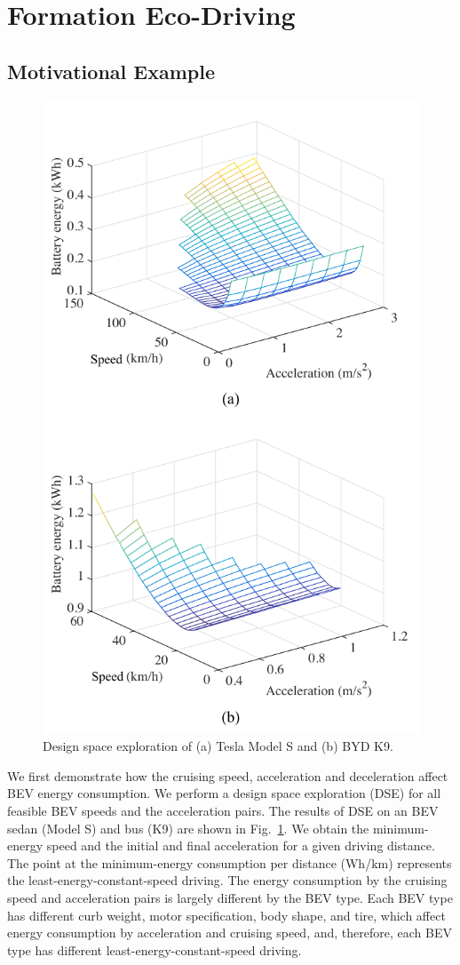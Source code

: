 \documentclass{IEEEtran}
\begin{document}
\section{Formation Eco-Driving}\label{sec:problem}

\subsection{Motivational Example}

\begin{figure}	%
\centering
\includegraphics[width=0.8\hsize]{Figures/DSE.pdf}
\caption{Design space exploration of (a) Tesla Model S and (b) BYD K9.}
\label{fig:DSE}
\end{figure} 


We first demonstrate how the cruising speed, acceleration and deceleration affect BEV energy consumption. We perform a design space exploration (DSE) for all feasible BEV speeds and the acceleration pairs. The results of DSE on an BEV sedan (Model S) and bus (K9) are shown in Fig.~\ref{fig:DSE}. 
We obtain the minimum-energy speed and the initial and final acceleration for a given driving distance. 
The point at the minimum-energy consumption per distance (Wh/km) represents the least-energy-constant-speed driving. The energy consumption by the cruising speed and acceleration pairs is largely different by the BEV type. 
Each BEV type has different curb weight, motor specification, body shape, and tire, which affect energy consumption by acceleration and cruising speed, and, therefore, each BEV type has different least-energy-constant-speed driving.
\end{document}
